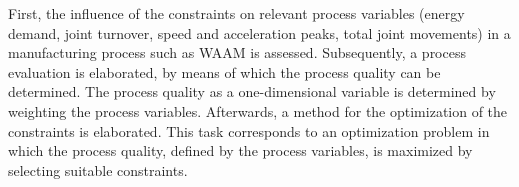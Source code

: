 First, the influence of the constraints on relevant process variables (energy demand, joint turnover, speed and acceleration peaks, total joint movements) in a manufacturing process such as \acrshort{WAAM} is assessed. Subsequently, a process evaluation is elaborated, by means of which the process quality can be determined. %
The process quality as a one-dimensional variable is determined by weighting the process variables. Afterwards, a method for the optimization of the constraints is elaborated. This task corresponds to an optimization problem in which the process quality, defined by the process variables, is maximized by selecting suitable constraints. 
